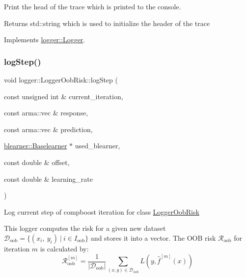Print the head of the trace which is printed to the console. 

\begin{DoxyReturn}{Returns}
{\ttfamily std\+::string} which is used to initialize the header of the trace 
\end{DoxyReturn}


Implements \mbox{\hyperlink{classlogger_1_1_logger_a825f96e8564ac4013ff09ef842c0aeec}{logger\+::\+Logger}}.

\mbox{\label{classlogger_1_1_logger_oob_risk_a4b0ea670a7970bca31037efab99cc06a}} 
\subsubsection{\texorpdfstring{log\+Step()}{logStep()}}
{\footnotesize\ttfamily void logger\+::\+Logger\+Oob\+Risk\+::log\+Step (\begin{DoxyParamCaption}\item[{const unsigned int \&}]{current\+\_\+iteration,  }\item[{const arma\+::vec \&}]{response,  }\item[{const arma\+::vec \&}]{prediction,  }\item[{\mbox{\hyperlink{classblearner_1_1_baselearner}{blearner\+::\+Baselearner}} $\ast$}]{used\+\_\+blearner,  }\item[{const double \&}]{offset,  }\item[{const double \&}]{learning\+\_\+rate }\end{DoxyParamCaption})\hspace{0.3cm}{\ttfamily [virtual]}}



Log current step of compboost iteration for class {\ttfamily \mbox{\hyperlink{classlogger_1_1_logger_oob_risk}{Logger\+Oob\+Risk}}} 

This logger computes the risk for a given new dataset $\mathcal{D}_\mathrm{oob} = \{(x_i,\ y_i)\ |\ i \in I_\mathrm{oob}\}$ and stores it into a vector. The O\+OB risk $\mathcal{R}_\mathrm{oob}$ for iteration $m$ is calculated by\+: \[ \mathcal{R}_\mathrm{oob}^{[m]} = \frac{1}{|\mathcal{D}_\mathrm{oob}|}\sum\limits_{(x,y) \in \mathcal{D}_\mathrm{oob}} L(y, \hat{f}^{[m]}(x)) \]

